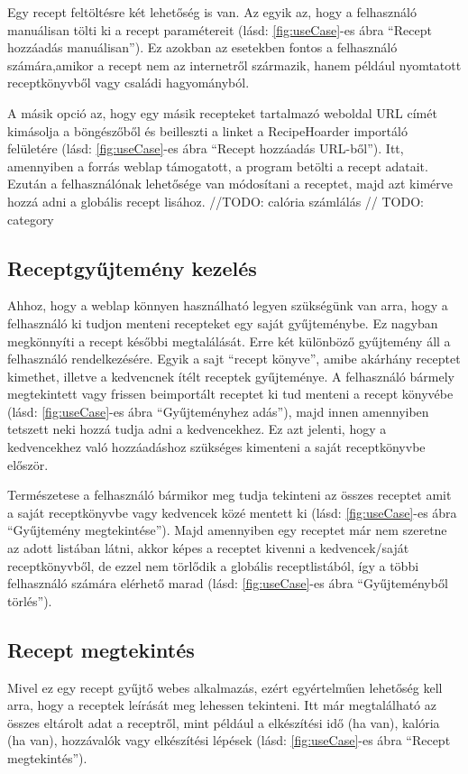 \documentclass[12pt]{report}
\theoremstyle{definition}
\begin{document}
Egy recept feltöltésre két lehetőség is van. Az egyik az, hogy a felhasználó manuálisan tölti ki a recept paramétereit (lásd: \ref{fig:useCase}-es ábra “Recept hozzáadás manuálisan”). Ez azokban az esetekben fontos a felhasználó számára,amikor a recept nem az internetről származik, hanem például nyomtatott receptkönyvből vagy családi hagyományból. 

A másik opció az, hogy egy másik recepteket tartalmazó weboldal URL címét kimásolja a böngészőből és beilleszti a linket a RecipeHoarder importáló felületére (lásd: \ref{fig:useCase}-es ábra “Recept hozzáadás URL-ből”). Itt, amennyiben a forrás weblap támogatott, a program betölti a recept adatait. Ezután a felhasználónak lehetősége van módosítani a receptet, majd azt kimérve hozzá adni a globális recept lisához.
//TODO: calória számlálás
// TODO: category


\subsection{Receptgyűjtemény kezelés}
Ahhoz, hogy a weblap könnyen használható legyen szükségünk van arra, hogy a felhasználó ki tudjon menteni recepteket egy saját gyűjteménybe. Ez nagyban megkönnyíti a recept későbbi megtalálását. Erre két különböző gyűjtemény áll a felhasználó rendelkezésére. Egyik a sajt “recept könyve”, amibe akárhány receptet kimethet, illetve a kedvencnek ítélt receptek gyűjteménye. A felhasználó bármely megtekintett vagy frissen beimportált receptet ki tud menteni a recept könyvébe (lásd: \ref{fig:useCase}-es ábra “Gyűjteményhez adás”), majd innen amennyiben tetszett neki hozzá tudja adni a kedvencekhez. Ez azt jelenti, hogy a kedvencekhez való hozzáadáshoz szükséges kimenteni a saját receptkönyvbe először. 

Természetese a felhasználó bármikor meg tudja tekinteni az összes receptet amit a saját receptkönyvbe vagy kedvencek közé mentett ki (lásd: \ref{fig:useCase}-es ábra “Gyűjtemény megtekintése”). Majd amennyiben egy receptet már nem szeretne az adott listában látni, akkor képes a receptet kivenni a kedvencek/saját receptkönyvből, de ezzel nem törlődik a globális receptlistából, így a többi felhasználó számára elérhető marad (lásd: \ref{fig:useCase}-es ábra “Gyűjteményből törlés”). 


\subsection{Recept megtekintés}
Mivel ez egy recept gyűjtő webes alkalmazás, ezért egyértelműen lehetőség kell arra, hogy a receptek leírását meg lehessen tekinteni. Itt már megtalálható az összes eltárolt adat a receptről, mint például a elkészítési idő (ha van), kalória (ha van), hozzávalók vagy elkészítési lépések (lásd: \ref{fig:useCase}-es ábra “Recept megtekintés”).
\end{document}

